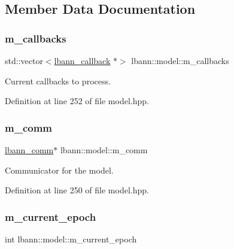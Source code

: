 \subsection{Member Data Documentation}
\mbox{\label{classlbann_1_1model_a07b511fef30368494c2ad80922ffd0eb}} 
\subsubsection{\texorpdfstring{m\+\_\+callbacks}{m\_callbacks}}
{\footnotesize\ttfamily std\+::vector$<$\hyperlink{classlbann_1_1lbann__callback}{lbann\+\_\+callback} $\ast$$>$ lbann\+::model\+::m\+\_\+callbacks\hspace{0.3cm}{\ttfamily [protected]}}

Current callbacks to process. 

Definition at line 252 of file model.\+hpp.

\mbox{\label{classlbann_1_1model_a0eabaf2b2f829fd5db3dfd26df420df0}} 
\subsubsection{\texorpdfstring{m\+\_\+comm}{m\_comm}}
{\footnotesize\ttfamily \hyperlink{classlbann_1_1lbann__comm}{lbann\+\_\+comm}$\ast$ lbann\+::model\+::m\+\_\+comm\hspace{0.3cm}{\ttfamily [protected]}}

Communicator for the model. 

Definition at line 250 of file model.\+hpp.

\mbox{\label{classlbann_1_1model_a305fac94b9063e59198c7f936923221a}} 
\subsubsection{\texorpdfstring{m\+\_\+current\+\_\+epoch}{m\_current\_epoch}}
{\footnotesize\ttfamily int lbann\+::model\+::m\+\_\+current\+\_\+epoch\hspace{0.3cm}{\ttfamily [protected]}}


